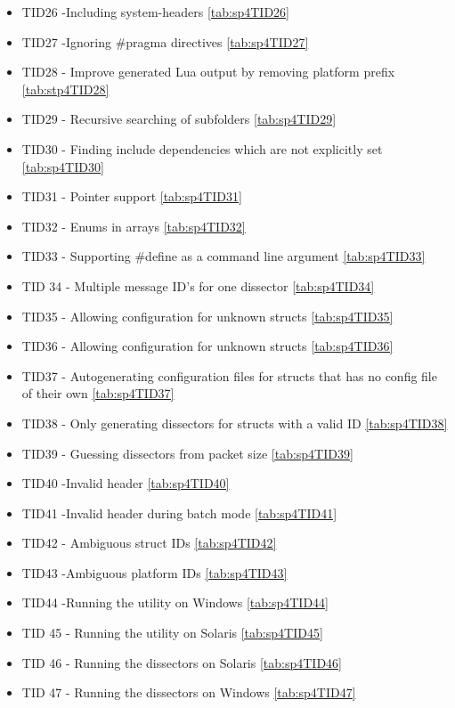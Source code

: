 \begin{itemize}
	\item TID26 -Including system-headers \autoref{tab:sp4TID26}
	\item TID27 -Ignoring \#pragma directives \autoref{tab:sp4TID27}
	\item TID28 - Improve generated Lua output by removing platform prefix \autoref{tab:stp4TID28}
	\item TID29 - Recursive searching of subfolders \autoref{tab:sp4TID29}
	\item TID30 - Finding include dependencies which are not explicitly set \autoref{tab:sp4TID30}
	\item TID31 - Pointer support \autoref{tab:sp4TID31}
	\item TID32 - Enums in arrays \autoref{tab:sp4TID32}
	\item TID33 - Supporting \#define as a command line argument \autoref{tab:sp4TID33}
	\item TID 34 - Multiple message ID's for one dissector \autoref{tab:sp4TID34}
	\item TID35 - Allowing configuration for unknown structs \autoref{tab:sp4TID35}
	\item TID36 - Allowing configuration for unknown structs \autoref{tab:sp4TID36}
	\item TID37 - Autogenerating configuration files for structs that has no config file of their own \autoref{tab:sp4TID37}
	\item TID38 - Only generating dissectors for structs with a valid ID \autoref{tab:sp4TID38}
	\item TID39 - Guessing dissectors from packet size \autoref{tab:sp4TID39}
	\item TID40 -Invalid header \autoref{tab:sp4TID40}
	\item TID41 -Invalid header during batch mode \autoref{tab:sp4TID41}
	\item TID42 - Ambiguous struct IDs \autoref{tab:sp4TID42}
	\item TID43 -Ambiguous platform IDs \autoref{tab:sp4TID43}
	\item TID44 -Running the utility on Windows \autoref{tab:sp4TID44}
	\item TID 45 - Running the utility on Solaris \autoref{tab:sp4TID45}
	\item TID 46 - Running the dissectors on Solaris \autoref{tab:sp4TID46}
	\item TID 47 - Running the dissectors on Windows \autoref{tab:sp4TID47}	
\end{itemize}

